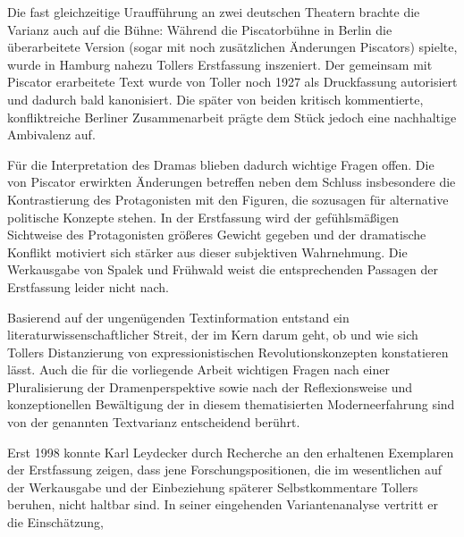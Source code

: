 Die fast gleichzeitige Uraufführung an zwei deutschen Theatern brachte die
Varianz auch auf die Bühne: Während die Piscatorbühne in Berlin die
überarbeitete Version (sogar mit noch zusätzlichen Änderungen Piscators)
spielte, wurde in Hamburg nahezu Tollers Erstfassung
inszeniert.  
Der gemeinsam mit Piscator erarbeitete Text wurde von Toller noch 1927
als Druckfassung autorisiert und dadurch bald kanonisiert. Die später von
beiden kritisch kommentierte, konfliktreiche Berliner
Zusammenarbeit prägte dem Stück jedoch eine nachhaltige Ambivalenz
auf.

Für die Interpretation des Dramas blieben dadurch wichtige Fragen offen. Die
von Piscator erwirkten Änderungen betreffen neben dem Schluss insbesondere die
Kontrastierung des Protagonisten mit den Figuren, die sozusagen für
alternative politische Konzepte stehen. In der Erstfassung wird
der gefühlsmäßigen Sichtweise des Protagonisten größeres Gewicht gegeben
und der dramatische Konflikt motiviert sich stärker aus dieser subjektiven
Wahrnehmung. Die Werkausgabe von Spalek und
Frühwald weist die entsprechenden Passagen der Erstfassung leider nicht nach.

Basierend auf der ungenügenden Textinformation entstand ein
literaturwissenschaftlicher Streit, der im Kern darum geht, ob und wie sich
Tollers Distanzierung von expressionistischen Revolutionskonzepten
konstatieren lässt. Auch die für die vorliegende Arbeit wichtigen Fragen nach
einer Pluralisierung der Dramenperspektive sowie nach der Reflexionsweise und
konzeptionellen Bewältigung der in diesem \Cite{Zeitstück} thematisierten
 Moderneerfahrung sind von der genannten Textvarianz
entscheidend berührt.

Erst 1998 konnte Karl Leydecker durch Recherche an den erhaltenen Exemplaren
der Erstfassung zeigen, dass jene Forschungspositionen, die im wesentlichen
auf der Werkausgabe und der Einbeziehung späterer Selbstkommentare Tollers
beruhen, nicht haltbar sind. In seiner eingehenden Variantenanalyse vertritt
er die Einschätzung,

